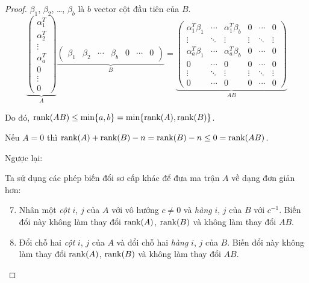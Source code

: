 \documentclass[class=nhvh-linear-algebra,crop=false]{standalone}
\begin{document}
\begin{proof}
	\par $\beta_{1}$, $\beta_{2}$, \ldots, $\beta_{b}$ là $b$ vector cột đầu tiên của $B$.
	\[
		\underbrace{\begin{pmatrix}
				\alpha_{1}^{T} \\
				\alpha_{2}^{T} \\
				\vdots         \\
				\alpha_{a}^{T} \\
				0              \\
				\vdots         \\
				0
			\end{pmatrix}}_{A}
		\underbrace{\begin{pmatrix}
				\beta_{1} & \beta_{2} & \cdots & \beta_{b} & 0 & \cdots & 0
			\end{pmatrix}}_{B}
		=
		\underbrace{\begin{pmatrix}
				\alpha_{1}^{T}\beta_{1} & \cdots & \alpha_{1}^{T}\beta_{b} & 0      & \cdots & 0      \\
				\vdots                  & \ddots & \vdots                  & \vdots & \ddots & \vdots \\
				\alpha_{a}^{T}\beta_{1} & \cdots & \alpha_{a}^{T}\beta_{b} & 0      & \cdots & 0      \\
				0                       & \cdots & 0                       & 0      & \cdots & 0      \\
				\vdots                  & \ddots & \vdots                  & \vdots & \ddots & \vdots \\
				0                       & \cdots & 0                       & 0      & \cdots & 0
			\end{pmatrix}}_{AB}
	\]
	\par Do đó, $\text{rank}(AB)\le \min\{ a, b \} = \min\{ \text{rank}(A), \text{rank}(B) \}$.
	\bigskip
	\par Nếu $A = 0$ thì $\text{rank}(A) + \text{rank}(B) - n = \text{rank}(B) - n\le 0 = \text{rank}(AB)$.
	\par Ngược lại:
	\par Ta sử dụng các phép biến đổi sơ cấp khác để đưa ma trận $A$ về dạng đơn giản hơn:
	\begin{enumerate}[label = (\roman*)]
		\setcounter{enumi}{6}
		\item Nhân một \textit{cột} $i$, $j$ của $A$ với vô hướng $c\ne 0$ và \textit{hàng} $i$, $j$ của $B$ với $c^{-1}$. Biến đổi này không làm thay đổi $\text{rank}(A)$, $\text{rank}(B)$ và không làm thay đổi $AB$.
		\item Đổi chỗ hai \textit{cột} $i$, $j$ của $A$ và đổi chỗ hai \textit{hàng} $i$, $j$ của $B$. Biến đổi này không làm thay đổi $\text{rank}(A)$, $\text{rank}(B)$ và không làm thay đổi $AB$.

\end{enumerate}
\end{proof}
\end{document}
